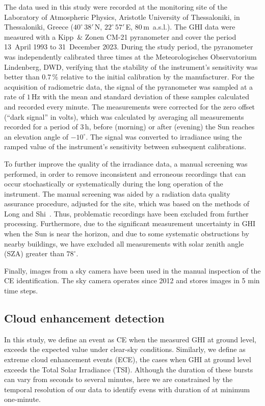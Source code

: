 \documentclass[preprint, 5p,
authoryear]{elsarticle} %
\begin{document}
The data used in this study were recorded at the monitoring site of the
Laboratory of Atmospheric Physics, Aristotle University of Thessaloniki,
in Thessaloniki, Greece (\(40^\circ\,38'\,\)N, \(22^\circ\,57'\,\)E,
\(80\,\)m~a.s.l.). The GHI data were measured with a Kipp~\& Zonen CM-21
pyranometer and cover the period 13~April 1993 to 31~December 2023.
During the study period, the pyranometer was independently calibrated
three times at the Meteorologisches Observatorium Lindenberg, DWD,
verifying that the stability of the instrument's sensitivity was better
than \(0.7\,\%\) relative to the initial calibration by the
manufacturer. For the acquisition of radiometric data, the signal of the
pyranometer was sampled at a rate of \(1\,\text{Hz}\) with the mean and
standard deviation of these samples calculated and recorded every
minute. The measurements were corrected for the zero offset (``dark
signal'' in volts), which was calculated by averaging all measurements
recorded for a period of \(3\,\text{h}\), before (morning) or after
(evening) the Sun reaches an elevation angle of \(-10^\circ\). The
signal was converted to irradiance using the ramped value of the
instrument's sensitivity between subsequent calibrations.

To further improve the quality of the irradiance data, a manual
screening was performed, in order to remove inconsistent and erroneous
recordings that can occur stochastically or systematically during the
long operation of the instrument. The manual screening was aided by a
radiation data quality assurance procedure, adjusted for the site, which
was based on the methods of Long and Shi~\citep{Long2006, Long2008a}.
Thus, problematic recordings have been excluded from further processing.
Furthermore, due to the significant measurement uncertainty in GHI when
the Sun is near the horizon, and due to some systematic obstructions by
nearby buildings, we have excluded all measurements with solar zenith
angle (SZA) greater than \(78^\circ\).

Finally, images from a sky camera have been used in the manual
inspection of the CE identification. The sky camera operates since 2012
and stores images in 5 min time steps.

\subsection{Cloud enhancement
detection}\label{cloud-enhancement-detection}

In this study, we define an event as CE when the measured GHI at ground
level, exceeds the expected value under clear-sky conditions. Similarly,
we define as extreme cloud enhancement events (ECE), the cases when GHI
at ground level exceeds the Total Solar Irradiance (TSI). Although the
duration of these bursts can vary from seconds to several minutes, here
we are constrained by the temporal resolution of our data to identify
evens with duration of at minimum one-minute.
\end{document}
